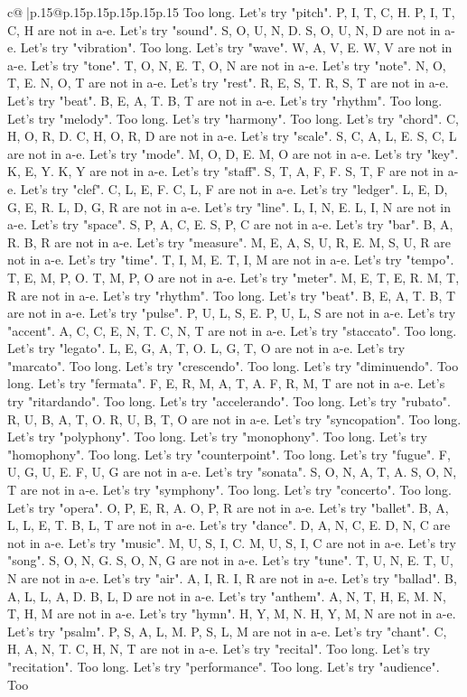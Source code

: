 \documentclass{article}
\begin{document}
{\begin{supertabular}{c@{$\;$}|p{.15\linewidth}@{}p{.15\linewidth}p{.15\linewidth}p{.15\linewidth}p{.15\linewidth}p{.15\linewidth}}
{{{Too long. Let's try "pitch". P, I, T, C, H. P, I, T, C, H are not in a{-}e. Let's try "sound". S, O, U, N, D. S, O, U, N, D are not in a{-}e. Let's try "vibration". Too long. Let's try "wave". W, A, V, E. W, V are not in a{-}e. Let's try "tone". T, O, N, E. T, O, N are not in a{-}e. Let's try "note". N, O, T, E. N, O, T are not in a{-}e. Let's try "rest". R, E, S, T. R, S, T are not in a{-}e. Let's try "beat". B, E, A, T. B, T are not in a{-}e. Let's try "rhythm". Too long. Let's try "melody". Too long. Let's try "harmony". Too long. Let's try "chord". C, H, O, R, D. C, H, O, R, D are not in a{-}e. Let's try "scale". S, C, A, L, E. S, C, L are not in a{-}e. Let's try "mode". M, O, D, E. M, O are not in a{-}e. Let's try "key". K, E, Y. K, Y are not in a{-}e. Let's try "staff". S, T, A, F, F. S, T, F are not in a{-}e. Let's try "clef". C, L, E, F. C, L, F are not in a{-}e. Let's try "ledger". L, E, D, G, E, R. L, D, G, R are not in a{-}e. Let's try "line". L, I, N, E. L, I, N are not in a{-}e. Let's try "space". S, P, A, C, E. S, P, C are not in a{-}e. Let's try "bar". B, A, R. B, R are not in a{-}e. Let's try "measure". M, E, A, S, U, R, E. M, S, U, R are not in a{-}e. Let's try "time". T, I, M, E. T, I, M are not in a{-}e. Let's try "tempo". T, E, M, P, O. T, M, P, O are not in a{-}e. Let's try "meter". M, E, T, E, R. M, T, R are not in a{-}e. Let's try "rhythm". Too long. Let's try "beat". B, E, A, T. B, T are not in a{-}e. Let's try "pulse". P, U, L, S, E. P, U, L, S are not in a{-}e. Let's try "accent". A, C, C, E, N, T. C, N, T are not in a{-}e. Let's try "staccato". Too long. Let's try "legato". L, E, G, A, T, O. L, G, T, O are not in a{-}e. Let's try "marcato". Too long. Let's try "crescendo". Too long. Let's try "diminuendo". Too long. Let's try "fermata". F, E, R, M, A, T, A. F, R, M, T are not in a{-}e. Let's try "ritardando". Too long. Let's try "accelerando". Too long. Let's try "rubato". R, U, B, A, T, O. R, U, B, T, O are not in a{-}e. Let's try "syncopation". Too long. Let's try "polyphony". Too long. Let's try "monophony". Too long. Let's try "homophony". Too long. Let's try "counterpoint". Too long. Let's try "fugue". F, U, G, U, E. F, U, G are not in a{-}e. Let's try "sonata". S, O, N, A, T, A. S, O, N, T are not in a{-}e. Let's try "symphony". Too long. Let's try "concerto". Too long. Let's try "opera". O, P, E, R, A. O, P, R are not in a{-}e. Let's try "ballet". B, A, L, L, E, T. B, L, T are not in a{-}e. Let's try "dance". D, A, N, C, E. D, N, C are not in a{-}e. Let's try "music". M, U, S, I, C. M, U, S, I, C are not in a{-}e. Let's try "song". S, O, N, G. S, O, N, G are not in a{-}e. Let's try "tune". T, U, N, E. T, U, N are not in a{-}e. Let's try "air". A, I, R. I, R are not in a{-}e. Let's try "ballad". B, A, L, L, A, D. B, L, D are not in a{-}e. Let's try "anthem". A, N, T, H, E, M. N, T, H, M are not in a{-}e. Let's try "hymn". H, Y, M, N. H, Y, M, N are not in a{-}e. Let's try "psalm". P, S, A, L, M. P, S, L, M are not in a{-}e. Let's try "chant". C, H, A, N, T. C, H, N, T are not in a{-}e. Let's try "recital". Too long. Let's try "recitation". Too long. Let's try "performance". Too long. Let's try "audience". Too }}}
\end{supertabular}}
\end{document}
